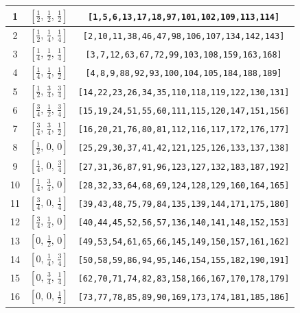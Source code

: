 \documentclass[fleqn,8pt]{jsarticle}
\begin{document}
\begin{longtable}{ccc}
1 & $\left[ \frac{1}{2},\, \frac{1}{2},\, \frac{1}{2} \right]$ & {\tt [1,5,6,13,17,18,97,101,102,109,113,114]} \\ \hline
2 & $\left[ \frac{1}{2},\, \frac{1}{4},\, \frac{1}{4} \right]$ & {\tt [2,10,11,38,46,47,98,106,107,134,142,143]} \\ \hline
3 & $\left[ \frac{1}{4},\, \frac{1}{2},\, \frac{1}{4} \right]$ & {\tt [3,7,12,63,67,72,99,103,108,159,163,168]} \\ \hline
4 & $\left[ \frac{1}{4},\, \frac{1}{4},\, \frac{1}{2} \right]$ & {\tt [4,8,9,88,92,93,100,104,105,184,188,189]} \\ \hline
5 & $\left[ \frac{1}{2},\, \frac{3}{4},\, \frac{3}{4} \right]$ & {\tt [14,22,23,26,34,35,110,118,119,122,130,131]} \\ \hline
6 & $\left[ \frac{3}{4},\, \frac{1}{2},\, \frac{3}{4} \right]$ & {\tt [15,19,24,51,55,60,111,115,120,147,151,156]} \\ \hline
7 & $\left[ \frac{3}{4},\, \frac{3}{4},\, \frac{1}{2} \right]$ & {\tt [16,20,21,76,80,81,112,116,117,172,176,177]} \\ \hline
8 & $\left[ \frac{1}{2},\, 0,\, 0 \right]$ & {\tt [25,29,30,37,41,42,121,125,126,133,137,138]} \\ \hline
9 & $\left[ \frac{1}{4},\, 0,\, \frac{3}{4} \right]$ & {\tt [27,31,36,87,91,96,123,127,132,183,187,192]} \\ \hline
10 & $\left[ \frac{1}{4},\, \frac{3}{4},\, 0 \right]$ & {\tt [28,32,33,64,68,69,124,128,129,160,164,165]} \\ \hline
11 & $\left[ \frac{3}{4},\, 0,\, \frac{1}{4} \right]$ & {\tt [39,43,48,75,79,84,135,139,144,171,175,180]} \\ \hline
12 & $\left[ \frac{3}{4},\, \frac{1}{4},\, 0 \right]$ & {\tt [40,44,45,52,56,57,136,140,141,148,152,153]} \\ \hline
13 & $\left[ 0,\, \frac{1}{2},\, 0 \right]$ & {\tt [49,53,54,61,65,66,145,149,150,157,161,162]} \\ \hline
14 & $\left[ 0,\, \frac{1}{4},\, \frac{3}{4} \right]$ & {\tt [50,58,59,86,94,95,146,154,155,182,190,191]} \\ \hline
15 & $\left[ 0,\, \frac{3}{4},\, \frac{1}{4} \right]$ & {\tt [62,70,71,74,82,83,158,166,167,170,178,179]} \\ \hline
16 & $\left[ 0,\, 0,\, \frac{1}{2} \right]$ & {\tt [73,77,78,85,89,90,169,173,174,181,185,186]} \\
\end{longtable}
\renewcommand{\arraystretch}{1.2}
\end{document}
